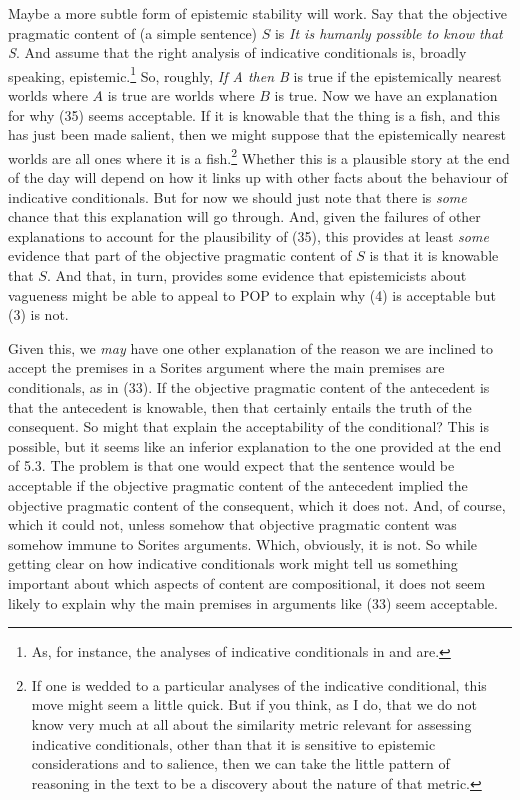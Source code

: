 Maybe a more subtle form of epistemic stability will work. Say that the objective pragmatic content of (a simple sentence) \(S\) is \textit{It is humanly possible to know that S}. And assume that the right analysis of indicative conditionals is, broadly speaking, epistemic.\footnote{As, for instance, the analyses of indicative conditionals in \citet{Stalnaker1975-STAIC, Davis1979} and \citet{Weatherson2001-WEAIAS} are.} So, roughly, \textit{If A then B} is true if the epistemically nearest worlds where \(A\) is true are worlds where \(B\) is true. Now we have an explanation for why (35) seems acceptable. If it is knowable that the thing is a fish, and this has just been made salient, then we might suppose that the epistemically nearest worlds are all ones where it is a fish.\footnote{If one is wedded to a particular analyses of the indicative conditional, this move might seem a little quick. But if you think, as I do, that we do not know very much at all about the similarity metric relevant for assessing indicative conditionals, other than that it is sensitive to epistemic considerations and to salience, then we can take the little pattern of reasoning in the text to be a discovery about the nature of that metric. } Whether this is a plausible story at the end of the day will depend on how it links up with other facts about the behaviour of indicative conditionals. But for now we should just note that there is \textit{some} chance that this explanation will go through. And, given the failures of other explanations to account for the plausibility of (35), this provides at least \textit{some} evidence that part of the objective pragmatic content of \(S\) is that it is knowable that \(S\). And that, in turn, provides some evidence that epistemicists about vagueness might be able to appeal to POP to explain why (4) is acceptable but (3) is not.

Given this, we \textit{may} have one other explanation of the reason we are inclined to accept the premises in a Sorites argument where the main premises are conditionals, as in (33). If the objective pragmatic content of the antecedent is that the antecedent is knowable, then that certainly entails the truth of the consequent. So might that explain the acceptability of the conditional? This is possible, but it seems like an inferior explanation to the one provided at the end of 5.3. The problem is that one would expect that the sentence would be acceptable if the objective pragmatic content of the antecedent implied the objective pragmatic content of the consequent, which it does not. And, of course, which it could not, unless somehow that objective pragmatic content was somehow immune to Sorites arguments. Which, obviously, it is not. So while getting clear on how indicative conditionals work might tell us something important about which aspects of content are compositional, it does not seem likely to explain why the main premises in arguments like (33) seem acceptable. 

